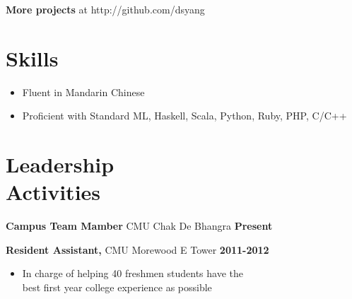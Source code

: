 \documentclass[sectioned]{dsyangres}
\begin{document}
\begin{resume}

\textbf{More projects} at http://github.com/dsyang

\section{Skills}

\begin{itemize} \itemsep -2pt
  \item Fluent in Mandarin Chinese
  \item Proficient with Standard ML, Haskell, Scala, Python, Ruby, PHP, C/C++
\end{itemize}

\section{Leadership \\ Activities}

\textbf{Campus Team Mamber} CMU Chak De Bhangra  \hfill \textbf{Present}

\textbf{Resident Assistant,} CMU Morewood E Tower \hfill \textbf{2011-2012}
  \begin{itemize} \itemsep -2pt
    \item In charge of helping 40 freshmen students have the\\ best
      first year college experience as possible
  \end{itemize}


\end{resume}
\end{document}
